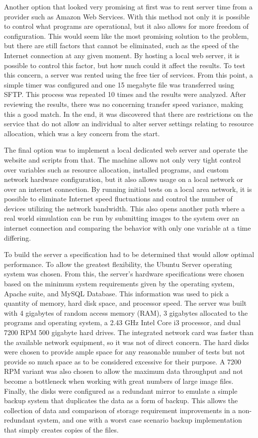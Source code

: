 Another option that looked very promising at first was to rent server time from a provider such as Amazon Web Services. With this method not only it is possible to control what programs are operational, but it also allows for more freedom of configuration. This would seem like the most promising solution to the problem, but there are still factors that cannot be eliminated, such as the speed of the Internet connection at any given moment. By hosting a local web server, it is possible to control this factor, but how much could it affect the results. To test this concern, a server was rented using the free tier of services. From this point, a simple timer was configured and one 15 megabyte file was transferred using SFTP. This process was repeated 10 times and the results were analyzed. After reviewing the results, there was no concerning transfer speed variance, making this a good match. In the end, it was discovered that there are restrictions on the service that do not allow an individual to alter server settings relating to resource allocation, which was a key concern from the start.

The final option was to implement a local dedicated web server and operate the website and scripts from that. The machine allows not only very tight control over variables such as resource allocation, installed programs, and custom network hardware configuration, but it also allows usage on a local network or over an internet connection. By running initial tests on a local area network, it is possible to eliminate Internet speed fluctuations and control the number of devices utilizing the network bandwidth. This also opens another path where a real world simulation can be run by submitting images to the system over an internet connection and comparing the behavior with only one variable at a time differing.

To build the server a specification had to be determined that would allow optimal performance. To allow the greatest flexibility, the Ubuntu Server operating system was chosen. From this, the server's hardware specifications were chosen based on the minimum system requirements given by the operating system, Apache suite, and MySQL Database. This information was used to pick a quantity of memory, hard disk space, and processor speed. The server was built with 4 gigabytes of random access memory (RAM), 3 gigabytes allocated to the programs and operating system, a 2.43 GHz Intel Core i3 processor, and dual 7200 RPM 500 gigabyte hard drives. The integrated network card was faster than the available network equipment, so it was not of direct concern. The hard disks were chosen to provide ample space for any reasonable number of tests but not provide so much space as to be considered excessive for their purpose. A 7200 RPM variant was also chosen to allow the maximum data throughput and not become a bottleneck when working with great numbers of large image files. Finally, the disks were configured as a redundant mirror to emulate a simple backup system that duplicates the data as a form of backup. This allows the collection of data and comparison of storage requirement improvements in a non-redundant system, and one with a worst case scenario backup implementation that simply creates copies of the files.

